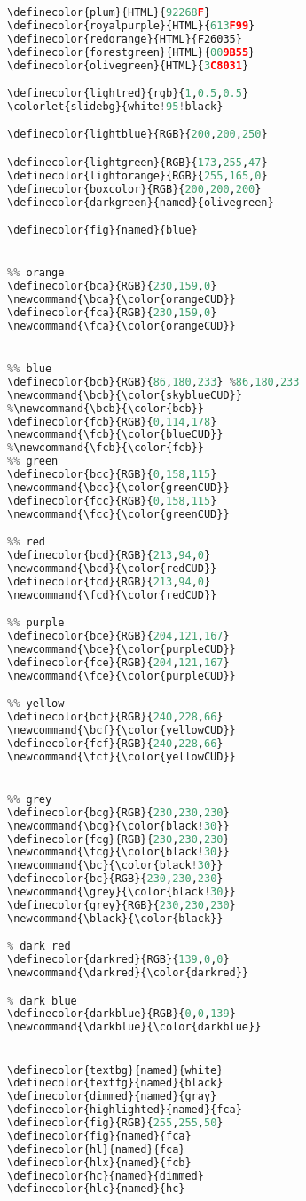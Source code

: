 {\begin{lstlisting}[language=Python,style=normal,escapechar=?,morekeywords={True, False}, mathescape]
%%% Some colours, from https://en.wikibooks.org/wiki/LaTeX/Colors
\definecolor{plum}{HTML}{92268F}
\definecolor{royalpurple}{HTML}{613F99}
\definecolor{redorange}{HTML}{F26035}
\definecolor{forestgreen}{HTML}{009B55}
\definecolor{olivegreen}{HTML}{3C8031}

\definecolor{lightred}{rgb}{1,0.5,0.5}
\colorlet{slidebg}{white!95!black}

\definecolor{lightblue}{RGB}{200,200,250}

\definecolor{lightgreen}{RGB}{173,255,47}
\definecolor{lightorange}{RGB}{255,165,0}
\definecolor{boxcolor}{RGB}{200,200,200}
\definecolor{darkgreen}{named}{olivegreen}

\definecolor{fig}{named}{blue}


%% orange
\definecolor{bca}{RGB}{230,159,0}
\newcommand{\bca}{\color{orangeCUD}}
\definecolor{fca}{RGB}{230,159,0}
\newcommand{\fca}{\color{orangeCUD}}


%% blue
\definecolor{bcb}{RGB}{86,180,233} %86,180,233
\newcommand{\bcb}{\color{skyblueCUD}}
%\newcommand{\bcb}{\color{bcb}}
\definecolor{fcb}{RGB}{0,114,178}
\newcommand{\fcb}{\color{blueCUD}}
%\newcommand{\fcb}{\color{fcb}}
%% green
\definecolor{bcc}{RGB}{0,158,115}
\newcommand{\bcc}{\color{greenCUD}}
\definecolor{fcc}{RGB}{0,158,115}
\newcommand{\fcc}{\color{greenCUD}}

%% red
\definecolor{bcd}{RGB}{213,94,0}
\newcommand{\bcd}{\color{redCUD}}
\definecolor{fcd}{RGB}{213,94,0}
\newcommand{\fcd}{\color{redCUD}}

%% purple
\definecolor{bce}{RGB}{204,121,167}
\newcommand{\bce}{\color{purpleCUD}}
\definecolor{fce}{RGB}{204,121,167}
\newcommand{\fce}{\color{purpleCUD}}

%% yellow
\definecolor{bcf}{RGB}{240,228,66}
\newcommand{\bcf}{\color{yellowCUD}}
\definecolor{fcf}{RGB}{240,228,66}
\newcommand{\fcf}{\color{yellowCUD}}


%% grey
\definecolor{bcg}{RGB}{230,230,230}
\newcommand{\bcg}{\color{black!30}}
\definecolor{fcg}{RGB}{230,230,230}
\newcommand{\fcg}{\color{black!30}}
\newcommand{\bc}{\color{black!30}}
\definecolor{bc}{RGB}{230,230,230}
\newcommand{\grey}{\color{black!30}}
\definecolor{grey}{RGB}{230,230,230}
\newcommand{\black}{\color{black}}

% dark red
\definecolor{darkred}{RGB}{139,0,0}
\newcommand{\darkred}{\color{darkred}}

% dark blue
\definecolor{darkblue}{RGB}{0,0,139}
\newcommand{\darkblue}{\color{darkblue}}


\definecolor{textbg}{named}{white}
\definecolor{textfg}{named}{black}
\definecolor{dimmed}{named}{gray}
\definecolor{highlighted}{named}{fca}
\definecolor{fig}{RGB}{255,255,50}
\definecolor{fig}{named}{fca}
\definecolor{hl}{named}{fca}
\definecolor{hlx}{named}{fcb}
\definecolor{hc}{named}{dimmed}
\definecolor{hlc}{named}{hc}


\end{lstlisting}}
